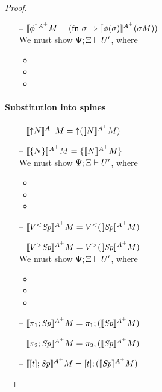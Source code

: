 \begin{proof}
\begin{itemize}
\item[--] $\lsubsta{\phi}{M}{A^+} 
           = (\mathsf{fn}~\sigma \Rightarrow \lsubsta{\phi(\sigma)}{(\sigma{M})}{A^+})$\\
  We must show $\foc{\Psi}{\Xi}{U'}$, where
  \begin{itemize}
  \item
  \item
  \item
  \end{itemize}
\end{itemize}

\paragraph{Substitution into spines}

\begin{itemize}
\item[--] $\lsubsta{\tupl{N}}{M}{A^+} = \tupl{(\lsubsta{N}{M}{A^+})}$
\item[--] $\lsubsta{\tlaxl{N}}{M}{A^+} = \tlaxl{\lsubsta{N}{M}{A^+}}$\\
  We must show $\foc{\Psi}{\Xi}{U'}$, where
  \begin{itemize}
  \item
  \item
  \item
  \end{itemize}
\item[--] $\lsubsta{\tappl{V}{\Sp}}{M}{A^+} 
           = \tappl{V}{(\lsubsta{\Sp}{M}{A^+})}$
\item[--] $\lsubsta{\tappr{V}{\Sp}}{M}{A^+} 
           = \tappr{V}{(\lsubsta{\Sp}{M}{A^+})}$\\
  We must show $\foc{\Psi}{\Xi}{U'}$, where
  \begin{itemize}
  \item
  \item
  \item
  \end{itemize}
\item[--] $\lsubsta{\tpione{\Sp}}{M}{A^+} = \tpione{(\lsubsta{\Sp}{M}{A^+})}$
\item[--] $\lsubsta{\tpitwo{\Sp}}{M}{A^+} = \tpitwo{(\lsubsta{\Sp}{M}{A^+})}$
\item[--] $\lsubsta{\tforalll{t}{\Sp}}{M}{A^+} 
           = \tforalll{t}{(\lsubsta{\Sp}{M}{A^+})}$
\end{itemize}



\end{proof}
